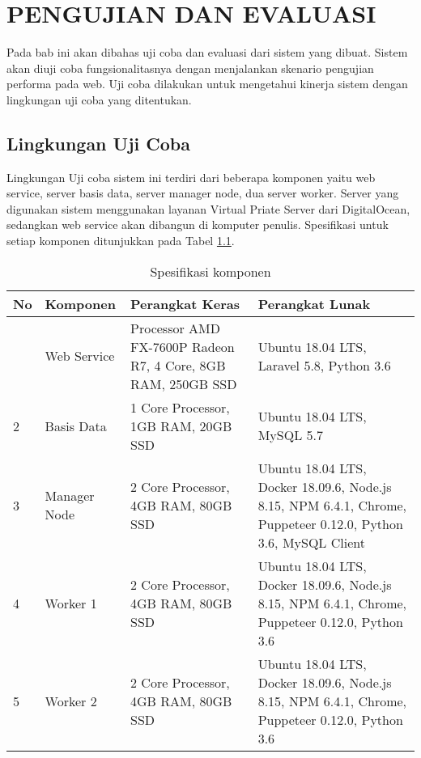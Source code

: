\chapter{PENGUJIAN DAN EVALUASI}
	Pada bab ini akan dibahas uji coba dan evaluasi dari sistem yang dibuat. Sistem akan diuji coba fungsionalitasnya dengan menjalankan skenario pengujian performa pada web. Uji coba dilakukan untuk mengetahui kinerja sistem dengan lingkungan uji coba yang ditentukan.
	
	\section{Lingkungan Uji Coba}
		Lingkungan Uji coba sistem ini terdiri dari beberapa komponen yaitu web service, server basis data, server manager node, dua server worker. Server yang digunakan sistem menggunakan layanan Virtual Priate Server dari DigitalOcean, sedangkan web service akan dibangun di komputer penulis. Spesifikasi untuk setiap komponen ditunjukkan pada Tabel \ref{tabelspesifikasi}.
		\begin{longtable}{|p{}|p{}|p{}|p{}|}
			\caption{Spesifikasi komponen} \label{tabelspesifikasi} \\
			\hline
			\textbf{No} & \textbf{Komponen} & \textbf{Perangkat Keras} & \textbf{Perangkat Lunak} \\ \hline
			\endhead
			\endfoot
			\endlastfoot
			1 & Web Service & Processor AMD FX-7600P Radeon R7, 4 Core, 8GB RAM, 250GB SSD & Ubuntu 18.04 LTS, Laravel 5.8, Python 3.6 \\ \hline
			2 & Basis Data & 1 Core Processor, 1GB RAM, 20GB SSD & Ubuntu 18.04 LTS, MySQL 5.7 \\ \hline
			3 & Manager Node & 2 Core Processor, 4GB RAM, 80GB SSD & Ubuntu 18.04 LTS, Docker 18.09.6, Node.js 8.15, NPM 6.4.1, Chrome, Puppeteer 0.12.0, Python 3.6, MySQL Client \\ \hline
			4 & Worker 1 & 2 Core Processor, 4GB RAM, 80GB SSD & Ubuntu 18.04 LTS, Docker 18.09.6, Node.js 8.15, NPM 6.4.1, Chrome, Puppeteer 0.12.0, Python 3.6 \\ \hline
			5 & Worker 2 & 2 Core Processor, 4GB RAM, 80GB SSD & Ubuntu 18.04 LTS, Docker 18.09.6, Node.js 8.15, NPM 6.4.1, Chrome, Puppeteer 0.12.0, Python 3.6 \\ \hline
		\end{longtable}
	
